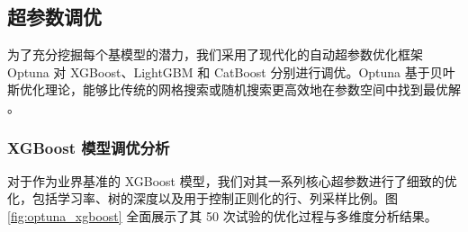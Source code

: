 \documentclass{thuemp}
\begin{document}
\subsection{超参数调优}

为了充分挖掘每个基模型的潜力，我们采用了现代化的自动超参数优化框架 Optuna 对 XGBoost、LightGBM 和 CatBoost 分别进行调优。Optuna 基于贝叶斯优化理论，能够比传统的网格搜索或随机搜索更高效地在参数空间中找到最优解 \citep{akiba2019optuna}。


\subsubsection{XGBoost 模型调优分析}

对于作为业界基准的 XGBoost 模型，我们对其一系列核心超参数进行了细致的优化，包括学习率、树的深度以及用于控制正则化的行、列采样比例。图 \ref{fig:optuna_xgboost} 全面展示了其 50 次试验的优化过程与多维度分析结果。
\end{document}
